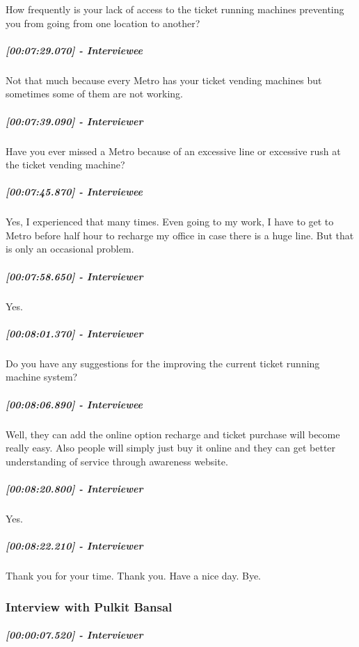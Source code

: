 \documentclass[a4paper,12pt]{article}
\begin{document}
How frequently is your lack of access to the ticket running machines
preventing you from going from one location to another?

\hypertarget{interviewee-27}{%
\subparagraph{{[}00:07:29.070{]} - Interviewee}\label{interviewee-27}}

Not that much because every Metro has your ticket vending machines but
sometimes some of them are not working.

\hypertarget{interviewer-34}{%
\subparagraph{{[}00:07:39.090{]} - Interviewer}\label{interviewer-34}}

Have you ever missed a Metro because of an excessive line or excessive
rush at the ticket vending machine?

\hypertarget{interviewee-28}{%
\subparagraph{{[}00:07:45.870{]} - Interviewee}\label{interviewee-28}}

Yes, I experienced that many times. Even going to my work, I have to get
to Metro before half hour to recharge my office in case there is a huge
line. But that is only an occasional problem.

\hypertarget{interviewer-35}{%
\subparagraph{{[}00:07:58.650{]} - Interviewer}\label{interviewer-35}}

Yes.

\hypertarget{interviewer-36}{%
\subparagraph{{[}00:08:01.370{]} - Interviewer}\label{interviewer-36}}

Do you have any suggestions for the improving the current ticket running
machine system?

\hypertarget{interviewee-29}{%
\subparagraph{{[}00:08:06.890{]} - Interviewee}\label{interviewee-29}}

Well, they can add the online option recharge and ticket purchase will
become really easy. Also people will simply just buy it online and they
can get better understanding of service through awareness website.

\hypertarget{interviewer-37}{%
\subparagraph{{[}00:08:20.800{]} - Interviewer}\label{interviewer-37}}

Yes.

\hypertarget{interviewer-38}{%
\subparagraph{{[}00:08:22.210{]} - Interviewer}\label{interviewer-38}}

Thank you for your time. Thank you. Have a nice day. Bye.

\newpage
\subsubsection{Interview with Pulkit Bansal}
\hypertarget{interviewer-1}{%
\subparagraph{{[}00:00:07.520{]} - Interviewer}\label{interviewer-1}}
\end{document}
